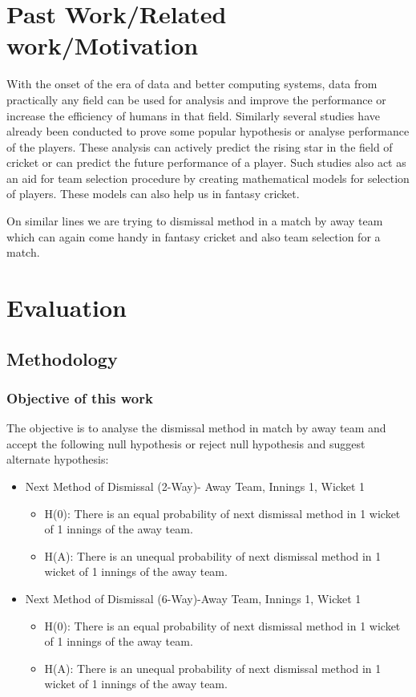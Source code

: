 \documentclass[fleqn,10pt]{wlscirep}
\begin{document}
\section{Past Work/Related work/Motivation}
With the onset of the era of data and better computing systems, data from practically any field can be used for analysis and 
improve the performance or increase the efficiency of humans in that field. Similarly several studies have already been conducted to prove some popular 
hypothesis or analyse performance of the players. These analysis can actively predict the rising star in the field of cricket or can predict the 
future performance of a player. Such studies also act as an aid for team selection procedure by creating mathematical models for selection of players.
These models can also help us in fantasy cricket.

On similar lines we are trying to dismissal method in a match by away team which can again come handy in fantasy cricket and also team selection for a match.

\section{Evaluation}
\subsection{Methodology}
\subsubsection{Objective of this work}
The objective is to analyse the dismissal method in match by away team and accept the following null hypothesis or reject null hypothesis and suggest alternate hypothesis:
\begin{itemize}
\item Next Method of Dismissal (2-Way)- Away Team, Innings 1, Wicket 1
\begin{itemize}
\item H(0): There is an equal probability of next dismissal method in 1 wicket of 1 innings of the away team.
\item H(A): There is an unequal probability of next dismissal method in 1 wicket of 1 innings of the away team.
\end{itemize}
\item Next Method of Dismissal (6-Way)-Away Team, Innings 1, Wicket 1
\begin{itemize}
\item H(0): There is an equal probability of next dismissal method in 1 wicket of 1 innings of the away team.
\item H(A): There is an unequal probability of next dismissal method in 1 wicket of 1 innings of the away team.
\end{itemize}
\end{itemize}
\end{document}
